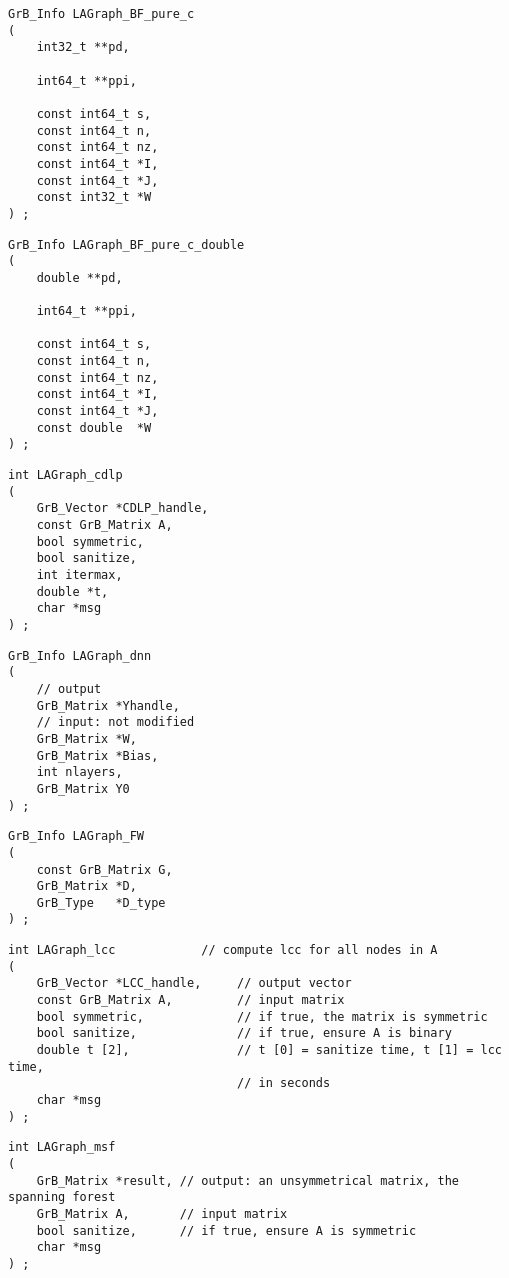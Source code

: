 \begin{verbatim}
GrB_Info LAGraph_BF_pure_c
(
    int32_t **pd,

    int64_t **ppi,

    const int64_t s,
    const int64_t n,
    const int64_t nz,
    const int64_t *I,
    const int64_t *J,
    const int32_t *W
) ;
\end{verbatim}




\begin{verbatim}
GrB_Info LAGraph_BF_pure_c_double
(
    double **pd,

    int64_t **ppi,

    const int64_t s,
    const int64_t n,
    const int64_t nz,
    const int64_t *I,
    const int64_t *J,
    const double  *W
) ;
\end{verbatim}




\begin{verbatim}
int LAGraph_cdlp
(
    GrB_Vector *CDLP_handle,
    const GrB_Matrix A,
    bool symmetric,
    bool sanitize,
    int itermax,
    double *t,
    char *msg
) ;
\end{verbatim}




\begin{verbatim}
GrB_Info LAGraph_dnn
(
    // output
    GrB_Matrix *Yhandle,
    // input: not modified
    GrB_Matrix *W,
    GrB_Matrix *Bias,
    int nlayers,
    GrB_Matrix Y0
) ;
\end{verbatim}




\begin{verbatim}
GrB_Info LAGraph_FW
(
    const GrB_Matrix G,
    GrB_Matrix *D,
    GrB_Type   *D_type
) ;
\end{verbatim}




\begin{verbatim}
int LAGraph_lcc            // compute lcc for all nodes in A
(
    GrB_Vector *LCC_handle,     // output vector
    const GrB_Matrix A,         // input matrix
    bool symmetric,             // if true, the matrix is symmetric
    bool sanitize,              // if true, ensure A is binary
    double t [2],               // t [0] = sanitize time, t [1] = lcc time,
                                // in seconds
    char *msg
) ;
\end{verbatim}




\begin{verbatim}
int LAGraph_msf
(
    GrB_Matrix *result, // output: an unsymmetrical matrix, the spanning forest
    GrB_Matrix A,       // input matrix
    bool sanitize,      // if true, ensure A is symmetric
    char *msg
) ;
\end{verbatim}




